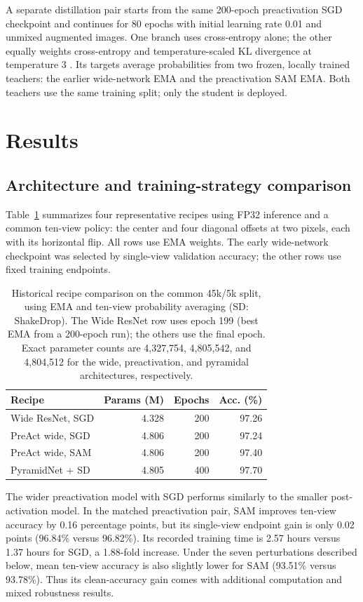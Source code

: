 \documentclass[letterpaper]{article}
\begin{document}
A separate distillation pair starts from the same 200-epoch preactivation SGD checkpoint and continues for 80 epochs with initial learning rate 0.01 and unmixed augmented images. One branch uses cross-entropy alone; the other equally weights cross-entropy and temperature-scaled KL divergence at temperature 3 \citep{hinton2015distilling}. Its targets average probabilities from two frozen, locally trained teachers: the earlier wide-network EMA and the preactivation SAM EMA. Both teachers use the same training split; only the student is deployed.

\section{Results}
\subsection{Architecture and training-strategy comparison}
Table~\ref{tab:history} summarizes four representative recipes using FP32 inference and a common ten-view policy: the center and four diagonal offsets at two pixels, each with its horizontal flip. All rows use EMA weights. The early wide-network checkpoint was selected by single-view validation accuracy; the other rows use fixed training endpoints.

\begin{table}[t]
\centering\small
\begin{tabular}{lrrr}
\hline
Recipe & Params (M) & Epochs & Acc. (\%)\\\hline
Wide ResNet, SGD &4.328&200&97.26\\
PreAct wide, SGD &4.806&200&97.24\\
PreAct wide, SAM &4.806&200&97.40\\
PyramidNet + SD &4.805&400&97.70\\\hline
\end{tabular}
\caption{Historical recipe comparison on the common 45k/5k split, using EMA and ten-view probability averaging (SD: ShakeDrop). The Wide ResNet row uses epoch 199 (best EMA from a 200-epoch run); the others use the final epoch. Exact parameter counts are 4,327,754, 4,805,542, and 4,804,512 for the wide, preactivation, and pyramidal architectures, respectively.}
\label{tab:history}
\end{table}

The wider preactivation model with SGD performs similarly to the smaller post-activation model. In the matched preactivation pair, SAM improves ten-view accuracy by 0.16 percentage points, but its single-view endpoint gain is only 0.02 points (96.84\% versus 96.82\%). Its recorded training time is 2.57 hours versus 1.37 hours for SGD, a 1.88-fold increase. Under the seven perturbations described below, mean ten-view accuracy is also slightly lower for SAM (93.51\% versus 93.78\%). Thus its clean-accuracy gain comes with additional computation and mixed robustness results.
\end{document}

